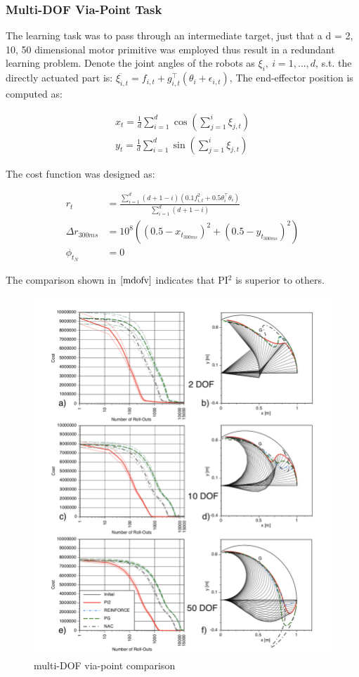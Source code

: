 \documentclass[journal]{IEEEtran}
\begin{document}
\subsubsection{Multi-DOF Via-Point Task}

The learning task was to pass through an intermediate target, just that a d = 2, 10, 50 dimensional motor primitive was employed thus result in a redundant learning 
problem. 
Denote the joint angles of the robots as $\xi_i,\ i=1,\ldots,d $, s.t. the directly actuated part is: 
$\ddot{\xi_{i,t}} = f_{i, t} + g_{i, t}^{\top}(\theta_i + \epsilon_{i,t})$, The end-effector position is computed as: 

\begin{equation}
  \begin{aligned}
    x_t = \frac{1}{d} \sum_{i=1}^{d}\cos(\sum_{j=1}^{i}\xi_{j,t}) \\
    y_t = \frac{1}{d} \sum_{i=1}^{d}\sin(\sum_{j=1}^{i}\xi_{j,t}) \nonumber 
  \end{aligned}
\end{equation}

The cost function was designed as:

\begin{equation} 
  \begin{aligned}
    r_t &= \frac{\sum_{i=1}^{d}(d+1-i)(0.1f_{i,t}^2+ 0.5\theta_i^{\top}\theta_i)}{\sum_{i=1}^{d}(d+1-i)} \\
    \Delta r_{300ms} &= 10^8((0.5 - x_{t_{300ms}})^2+(0.5 - y_{t_{300ms}})^{2})  \nonumber \\ 
    \phi_{t_N} &= 0 
  \end{aligned}
\end{equation}

The comparison shown in $\ref{mdofv}$ indicates that PI$^2$ is superior to others.

\begin{figure}[htbp]
  \includegraphics[width = .5\textwidth]{mdofv}
  \caption{multi-DOF via-point comparison}
  \label{mdofv}
\end{figure}
\end{document}
